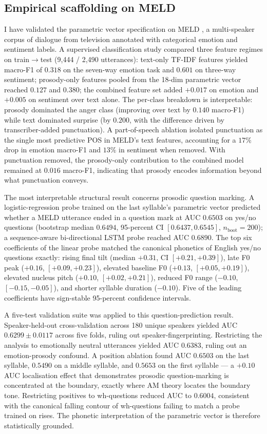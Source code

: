 \documentclass[11pt,letterpaper]{article}
\begin{document}
\subsection{Empirical scaffolding on MELD}\label{sec:experiments-meld}

I have validated the parametric vector specification on MELD \citep{poria2019meld}, a multi-speaker corpus of dialogue from television annotated with categorical emotion and sentiment labels. A supervised classification study compared three feature regimes on train$\to$test (9{,}444 / 2{,}490 utterances): text-only TF-IDF features yielded macro-F1 of $0.318$ on the seven-way emotion task and $0.601$ on three-way sentiment; prosody-only features pooled from the 18-dim parametric vector reached $0.127$ and $0.380$; the combined feature set added $+0.017$ on emotion and $+0.005$ on sentiment over text alone. The per-class breakdown is interpretable: prosody dominated the anger class (improving over text by $0.140$ macro-F1) while text dominated surprise (by $0.200$, with the difference driven by transcriber-added punctuation). A part-of-speech ablation isolated punctuation as the single most predictive POS in MELD's text features, accounting for a $17\%$ drop in emotion macro-F1 and $13\%$ in sentiment when removed. With punctuation removed, the prosody-only contribution to the combined model remained at $0.016$ macro-F1, indicating that prosody encodes information beyond what punctuation conveys.

The most interpretable structural result concerns prosodic question marking. A logistic-regression probe trained on the last syllable's parametric vector predicted whether a MELD utterance ended in a question mark at AUC $0.6503$ on yes/no questions (bootstrap median $0.6494$, 95-percent CI $[0.6437, 0.6545]$, $n_{\text{boot}} = 200$); a sequence-aware bi-directional LSTM probe reached AUC $0.6890$. The top six coefficients of the linear probe matched the canonical phonetics of English yes/no questions exactly: rising final tilt (median $+0.31$, CI $[+0.21, +0.39]$), late F0 peak ($+0.16$, $[+0.09, +0.23]$), elevated baseline F0 ($+0.13$, $[+0.05, +0.19]$), elevated nucleus pitch ($+0.10$, $[+0.02, +0.21]$), reduced F0 range ($-0.10$, $[-0.15, -0.05]$), and shorter syllable duration ($-0.10$). Five of the leading coefficients have sign-stable 95-percent confidence intervals.

A five-test validation suite was applied to this question-prediction result. Speaker-held-out cross-validation across 180 unique speakers yielded AUC $0.6299 \pm 0.0117$ across five folds, ruling out speaker-fingerprinting. Restricting the analysis to emotionally neutral utterances yielded AUC $0.6383$, ruling out an emotion-prosody confound. A position ablation found AUC $0.6503$ on the last syllable, $0.5490$ on a middle syllable, and $0.5653$ on the first syllable --- a $+0.10$ AUC localisation effect that demonstrates prosodic question-marking is concentrated at the boundary, exactly where AM theory locates the boundary tone. Restricting positives to wh-questions reduced AUC to $0.6004$, consistent with the canonical falling contour of wh-questions failing to match a probe trained on rises. The phonetic interpretation of the parametric vector is therefore statistically grounded.
\end{document}
